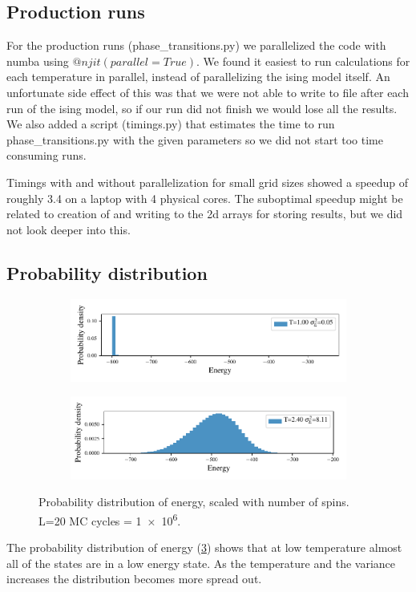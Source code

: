 \subsection{Production runs}

For the production runs (phase\_transitions.py) we parallelized the code with
numba using $@njit(parallel=True)$. We found it easiest to run calculations for
each temperature in parallel, instead of parallelizing the ising model itself.
An unfortunate side effect of this was that we were not able to write to file
after each run of the ising model, so if our run did not finish we would lose
all the results. We also added a script (timings.py) that estimates the time to
run phase\_transitions.py with the given parameters so we did not start too time
consuming runs.

Timings with and without parallelization for small grid sizes showed a speedup
of roughly 3.4 on a laptop with 4 physical cores. The suboptimal speedup might
be related to creation of and writing to the 2d arrays for storing results,
but we did not look deeper into this.

\subsection{Probability distribution}

\begin{figure}[ht]
  \begin{subfigure}[t]{\textwidth} %
    \centering
    \includegraphics[width=\linewidth]{../figures/distribution_0.pdf}
    \caption{}
    \label{fig:sub-first}
  \end{subfigure}
  \hfill
  \newline
  \begin{subfigure}[t]{\textwidth}
    \centering
    \includegraphics[width=\linewidth]{../figures/distribution_5.pdf}
    \caption{}
    \label{fig:sub-second}
  \end{subfigure}
  \label{fig:distribution}
  \caption{Probability distribution of energy, scaled with number of spins. L=20
  MC cycles = \num{1e6}.}
\end{figure}


The probability distribution of energy (\cref{fig:distribution}) shows that
at low temperature almost all of the states are in a low energy state.
As the temperature and the variance increases the distribution becomes more
spread out.
